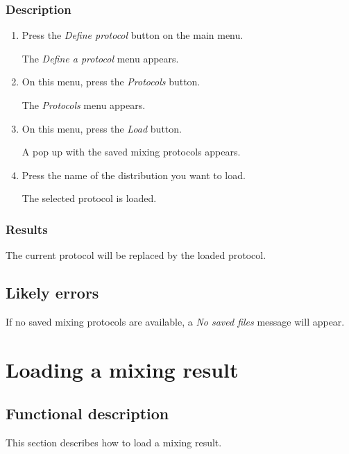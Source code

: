 \subsubsection{Description}
\begin{enumerate}
	\item Press the \emph{Define protocol} button on the main menu.
		\begin{itemize}
            The \emph{Define a protocol} menu appears.
		\end{itemize}
	\item On this menu, press the \emph{Protocols} button. 
		\begin{itemize}
             The \emph{Protocols} menu appears. 
		\end{itemize}
	\item On this menu, press the \emph{Load} button. 
		\begin{itemize}
            A pop up with the saved mixing protocols appears. 
		\end{itemize}
    \item Press the name of the distribution you want to load.
   		\begin{itemize}
            The selected protocol is loaded.
		\end{itemize}
\end{enumerate}

\subsubsection{Results}
The current protocol will be replaced by the loaded protocol.

\subsection{Likely errors}
If no saved mixing protocols are available, a \emph{No saved files} message will appear.


\section{Loading a mixing result}
\label{sec:loadMixResult}

\subsection{Functional description}
This section describes how to load a mixing result.

